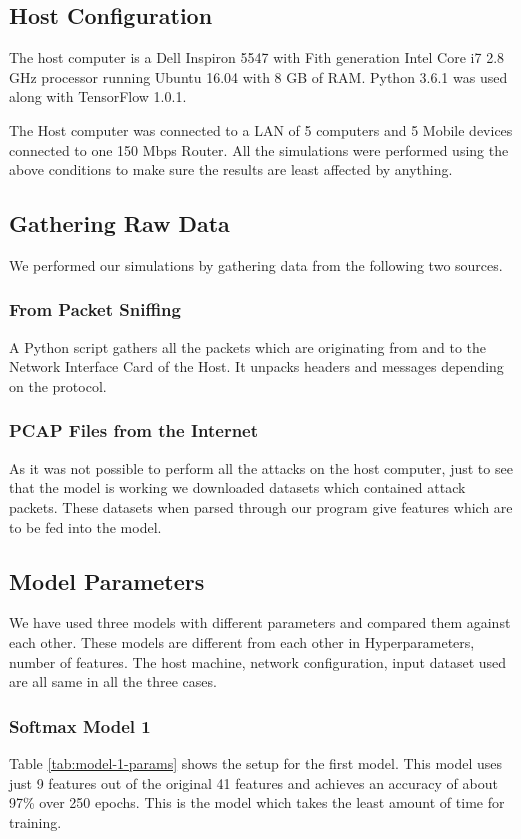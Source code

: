 \documentclass[12pt]{article}
\theoremstyle{definition}
\begin{document}
		\subsection{Host Configuration}
		The host computer is a Dell Inspiron 5547 with Fith generation Intel Core i7 2.8 GHz processor running Ubuntu 16.04 with 8 GB of RAM. Python 3.6.1 was used along with TensorFlow 1.0.1.
		
		The Host computer was connected to a LAN of 5 computers and 5 Mobile devices connected to one 150 Mbps Router. All the simulations were performed using the above conditions to make sure the results are least affected by anything.
		
		\subsection{Gathering Raw Data}
		We performed our simulations by gathering data from the following two sources. 
			\subsubsection{From Packet Sniffing}
			A Python script gathers all the packets which are originating from and to the Network Interface Card of the Host. It unpacks headers and messages depending on the protocol.
			
			\subsubsection{PCAP Files from the Internet}
			As it was not possible to perform all the attacks on the host computer, just to see that the model is working we downloaded datasets which contained attack packets. These datasets when parsed through our program give features which are to be fed into the model.
			
			
		\subsection{Model Parameters}
			We have used three models with different parameters and compared them against each other. These models are different from each other in Hyperparameters, number of features. The host machine, network configuration, input dataset used are all same in all the three cases.
			\subsubsection{Softmax Model 1}
			Table \ref{tab:model-1-params} shows the setup for the first model. This model uses just 9 features out of the original 41 features and achieves an accuracy of about 97\% over 250 epochs. This is the model which takes the least amount of time for training. 
			
\end{document}
